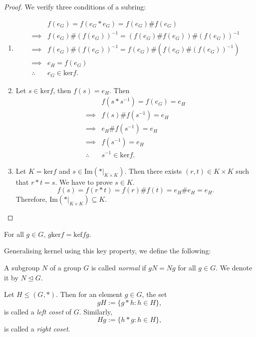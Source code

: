\begin{proof}
    We verify three conditions of a subring:
    \begin{enumerate}
    \item\begin{align*}
                & f(e_G) = f(e_G \ast e_G) = f(e_G) \# f(e_G)\\
        \implies & f(e_G) \# (f(e_G))^{-1} = (f(e_G) \# f(e_G)) \# (f(e_G))^{-1}\\
        \implies & f(e_G) \# (f(e_G))^{-1} = f(e_G) \# (f(e_G) \# (f(e_G))^{-1})\\
        \implies & e_H = f(e_G)\\
        \therefore \ & e_G \in \text{ker} f.
    \end{align*}
\item Let \(s \in \text{ker} f\), then \(f(s) = e_H\). Then
    \begin{align*}
        &f(s*s^{-1}) = f(e_G) = e_H\\
        \implies &f(s) \# f(s^{-1}) = e_H\\
        \implies &e_H \# f(s^{-1}) = e_H\\
        \implies &f(s^{-1}) = e_H\\
        \therefore \ &s^{-1} \in \text{ker} f.
    \end{align*}
\item Let \(K = \text{ker}f\) and \(s \in \text{Im}(\ast|_{K\times K})\). Then there exists \((r, t) \in K \times K\) such that \(r \ast t = s\). We have to prove \(s \in K\). \[f(s) = f(r \ast t) = f(r) \# f(t) = e_H \# e_H = e_H.\]
    Therefore, \(\text{Im}(\ast|_{K\times K}) \subseteq K\).
    \end{enumerate}
\end{proof}
\begin{proposition}
    For all \(g \in G\), \(g \text{ker} f = \text{kef} f g\). 
\end{proposition}
Generalising kernel using this key property, we define the following:
\begin{definition}
    A subgroup \(N\) of a group \(G\) is called \textit{normal} if \(gN = Ng\) for all \(g \in G\).  We denote it by \(N \trianglelefteq G\).
\end{definition}
\begin{definition}[Coset]
    Let \(H \leq (G, \ast)\). Then for an element \(g \in G\), the set \[gH := \{g \ast h : h \in H\},\] is called a \textit{left coset} of \(G\). Similarly, \[Hg := \{h \ast g : h \in H\},\] is called a \textit{right coset}.
\end{definition}
